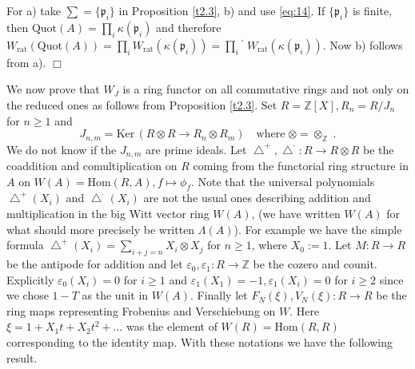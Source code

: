 \documentclass[12pt,leqno]{article}
\newcommand{\dis}{\displaystyle}
\newcommand{\Z}{{\mathbb{Z}}}
\newcommand{\Hom}{\mathrm{Hom}}
\newcommand{\Ker}{\mathrm{Ker}\,}
\newcommand{\rat}{\mathrm{rat}}
\newcommand{\ep}{\mathfrak{p}}
\newcommand{\rdp}{\!^{\dis\prime}\;}
\newcommand{\btu}{\bigtriangleup}
\newtheorem{prop}[theorem]{Proposition}
\newenvironment{definition}{\noindent {\bf Definition}\it}{}
\newenvironment{proof}{\noindent {\bf Proof}}{\mbox{}\hspace*{\fill}$\Box$}
\newcommand{\Quot}{\mathrm{Quot}}
\begin{document}
\begin{proof}
For a) take $\sum = \{ \ep_i \}$ in Proposition \ref{t2.3}, b) and use \eqref{eq:14}. If $\{ \ep_i \}$ is finite, then $\Quot (A) = \prod_i \kappa (\ep_i)$ and therefore $W_{\rat} (\Quot (A)) = \prod_i W_{\rat} (\kappa (\ep_i)) = \prod_i\rdp W_{\rat} (\kappa (\ep_i))$. Now b) follows from a).
\end{proof}

%
%
%

We now prove that $W_J$ is a ring functor on all commutative rings and not only on the reduced ones as follows from Proposition \ref{t2.3}. Set $R = \Z [X] , R_n = R / J_n$ for $n \ge 1$ and
\[
J_{n,m} = \Ker (R \otimes R \longrightarrow R_n \otimes R_m) \quad \text{where} \; \otimes = \otimes_{\Z} \; .
\]
We do not know if the $J_{n,m}$ are prime ideals. Let $\btu^+ , \btu^{\cdot} : R \to R \otimes R$ be the coaddition and comultiplication on $R$ coming from the functorial ring structure in $A$ on $W (A) = \Hom (R, A) , f \mapsto \phi_f$. Note that the universal polynomials $\btu^+ (X_i)$ and $\btu^{\cdot} (X_i)$ are not the usual ones describing addition and multiplication in the big Witt vector ring $W (A)$, (we have written $W (A)$ for what should more precisely be written $\Lambda (A)$). For example we have the simple formula $\btu^+ (X_i) = \sum_{i+j = n} X_i \otimes X_j$ for $n \ge 1$, where $X_0 := 1$. Let $M : R \to R$ be the antipode for addition and let $\varepsilon_0 , \varepsilon_1 : R \to \Z$ be the cozero and counit. Explicitly $\varepsilon_0 (X_i) = 0$ for $i \ge 1$ and $\varepsilon_1 (X_1) = -1 , \varepsilon_1 (X_i) = 0$ for $i \ge 2$ since we chose $1-T$ as the unit in $W (A)$. Finally let $F_N (\xi) , V_N (\xi) : R \to R$ be the ring maps representing Frobenius and Verschiebung on $W$. Here $\xi = 1 + X_1 t + X_2 t^2 + \ldots$ was the element of $W (R) = \Hom (R,R)$ corresponding to the identity map. With these notations we have the following result.
\end{document}
